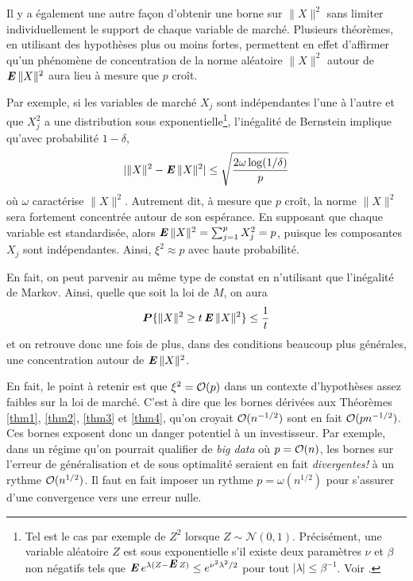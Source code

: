 Il y a également une autre façon d'obtenir une borne sur $\|X\|^2$ sans limiter
individuellement le support de chaque variable de marché. Plusieurs théorèmes, en
utilisant des hypothèses plus ou moins fortes, permettent en effet d'affirmer qu'un
phénomène de concentration de la norme aléatoire $\|X\|^2$ autour de $\operatorname{\mbox{\textbf{\textit{E}}}}\|X\|^2$ aura lieu
à mesure que $p$ croît.

Par exemple, si les variables de marché $X_j$ sont indépendantes l'une à l'autre et que
$X_j^2$ a une distribution sous exponentielle\footnote{Tel est le cas par exemple de $Z^2$
  lorsque $Z \sim \mathscr{N}(0,1)$. Précisément, une variable aléatoire $Z$ est sous
  exponentielle s'il existe deux paramètres $\nu$ et $\beta$ non négatifs tels que
  $\operatorname{\mbox{\textbf{\textit{E}}}} e^{\lambda(Z-\operatorname{\mbox{\textbf{\textit{E}}}} Z)} \leq e^{\nu^2\lambda^2/2}$ pour tout
  $|\lambda| \leq \beta^{-1}$. Voir \cite{boucheron2013concentration}.}, l'inégalité de Bernstein
implique qu'avec probabilité $1-\delta$,
\begin{equation}
  |\|X\|^2 - \operatorname{\mbox{\textbf{\textit{E}}}}\|X\|^2| \leq \sqrt\frac{2\omega\log(1/\delta)}{p}
\end{equation}
où $\omega$ caractérise $\|X\|^2$.  Autrement dit, à mesure que $p$ croît, la norme
$\|X\|^2$ sera fortement concentrée autour de son espérance. En supposant que chaque
variable est standardisée, alors $\operatorname{\mbox{\textbf{\textit{E}}}}\|X\|^2 = \sum_{j=1}^pX_j^2 = p$, puisque les composantes
$X_j$ sont indépendantes. Ainsi, $\xi^2 \approx p$ avec haute probabilité.

En fait, on peut parvenir au même type de constat en n'utilisant que l'inégalité de
Markov. Ainsi, quelle que soit la loi de $M$, on aura
\begin{equation}
  \bm P\{\|X\|^2 \ge t\operatorname{\mbox{\textbf{\textit{E}}}}\|X\|^2\} \leq \frac{1}{t}
\end{equation}
et on retrouve donc une fois de plus, dans des conditions beaucoup plus générales, une
concentration autour de $\operatorname{\mbox{\textbf{\textit{E}}}}\|X\|^2$. 

En fait, le point à retenir est que $\xi^2 = \mathcal O(p)$ dans un contexte d'hypothèses assez
faibles sur la loi de marché. C'est à dire que les bornes dérivées aux Théorèmes
\ref{thm1}, \ref{thm2}, \ref{thm3} et \ref{thm4}, qu'on croyait
$\mathcal O(n^{-1/2})$ sont en fait $\mathcal O(pn^{-1/2})$. Ces bornes exposent donc un
danger potentiel à un investisseur. Par exemple, dans un régime qu'on pourrait qualifier
de \textit{big data} où $p=\mathcal O(n)$, les bornes sur l'erreur de généralisation et de sous
optimalité seraient en fait \textit{divergentes!} à un rythme $\mathcal O(n^{1/2})$. Il faut en
fait imposer un rythme $p = \omega(n^{1/2})$ pour s'assurer d'une convergence vers une erreur
nulle.

